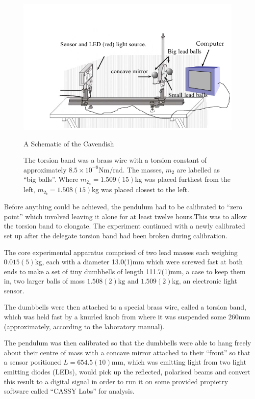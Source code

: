 \documentclass[12pt]{article}
\begin{document}
\begin{figure}[H]
\centering
\includegraphics[scale=0.5]{images/schematic.png}
\caption{A Schematic of the Cavendish}

\label{fig:layout}
\caption{The torsion band was a brass wire with a torsion constant of approximately $ 8.5 \times{10^{-9}}\mathrm{Nm/rad}$. The masses, $m_{2}$ are labelled as \enquote{big balls}. Where $m_{2_{a}}=1.509(15)$kg was placed furthest from the left, $m_{2_{b}}=1.508(15)$kg was placed closest to the left.}
\end{figure}

Before anything could be achieved, the pendulum had to be calibrated to \enquote{zero point} which involved leaving it alone for at least twelve hours.This was to allow the torsion band to elongate.\cite{manual} The experiment continued with a newly calibrated set up after the delegate torsion band had been broken during calibration. 


The core experimental apparatus comprised of two lead masses each weighing $0.015(5)\mathrm{kg}$, each with a diameter 13.0(1)mm which were screwed fast at both ends to make a set of tiny dumbbells of length 111.7(1)mm, a case to keep them in, two larger balls of mass $1.508(2)\mathrm{kg}$ and $1.509(2)\mathrm{kg}$, an electronic light sensor. 

The dumbbells were then attached to a special brass wire, called a torsion band, which was held fast by a knurled knob from where it was suspended some $ 260\mathrm{mm}$ (approximately, according to the laboratory manual).

 The pendulum was then calibrated so that the dumbbells were able to hang freely about their centre of mass with a concave mirror attached to their \enquote{front} so that a sensor positioned $L=654.5(10)\mathrm{mm}$, which was emitting light from two light emitting diodes (LEDs), would pick up the reflected, polarised beams and convert this result to a digital signal in order to run it on some provided propietry software called \enquote{CASSY Labs} for analysis.
\end{document}
